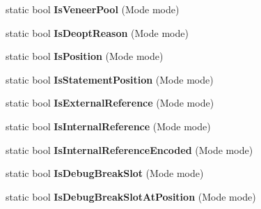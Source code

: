 \begin{DoxyCompactItemize}
\item 
static bool {\bfseries Is\+Veneer\+Pool} (Mode mode)\hypertarget{classv8_1_1internal_1_1_reloc_info_a154f34cc6320cbf6c1e8bdad051b5437}{}\label{classv8_1_1internal_1_1_reloc_info_a154f34cc6320cbf6c1e8bdad051b5437}

\item 
static bool {\bfseries Is\+Deopt\+Reason} (Mode mode)\hypertarget{classv8_1_1internal_1_1_reloc_info_acf1f2f5d69d0605ae6a4427fb0ab4e1c}{}\label{classv8_1_1internal_1_1_reloc_info_acf1f2f5d69d0605ae6a4427fb0ab4e1c}

\item 
static bool {\bfseries Is\+Position} (Mode mode)\hypertarget{classv8_1_1internal_1_1_reloc_info_a3494835fa667ff485f1cdbfe9995c392}{}\label{classv8_1_1internal_1_1_reloc_info_a3494835fa667ff485f1cdbfe9995c392}

\item 
static bool {\bfseries Is\+Statement\+Position} (Mode mode)\hypertarget{classv8_1_1internal_1_1_reloc_info_adb25b20e8e5daeced667dde430727ba4}{}\label{classv8_1_1internal_1_1_reloc_info_adb25b20e8e5daeced667dde430727ba4}

\item 
static bool {\bfseries Is\+External\+Reference} (Mode mode)\hypertarget{classv8_1_1internal_1_1_reloc_info_a5c60c6f1f4f0b00645865a4872b89859}{}\label{classv8_1_1internal_1_1_reloc_info_a5c60c6f1f4f0b00645865a4872b89859}

\item 
static bool {\bfseries Is\+Internal\+Reference} (Mode mode)\hypertarget{classv8_1_1internal_1_1_reloc_info_ae71eaf1d47bbb5222a7163a00aab7709}{}\label{classv8_1_1internal_1_1_reloc_info_ae71eaf1d47bbb5222a7163a00aab7709}

\item 
static bool {\bfseries Is\+Internal\+Reference\+Encoded} (Mode mode)\hypertarget{classv8_1_1internal_1_1_reloc_info_a6e8c55148df1c61000d41175cc8a0072}{}\label{classv8_1_1internal_1_1_reloc_info_a6e8c55148df1c61000d41175cc8a0072}

\item 
static bool {\bfseries Is\+Debug\+Break\+Slot} (Mode mode)\hypertarget{classv8_1_1internal_1_1_reloc_info_a01b23fb31661beba3637943088752467}{}\label{classv8_1_1internal_1_1_reloc_info_a01b23fb31661beba3637943088752467}

\item 
static bool {\bfseries Is\+Debug\+Break\+Slot\+At\+Position} (Mode mode)\hypertarget{classv8_1_1internal_1_1_reloc_info_ac73d1d0659b57b0b3117ef65aa651c49}{}\label{classv8_1_1internal_1_1_reloc_info_ac73d1d0659b57b0b3117ef65aa651c49}


\end{DoxyCompactItemize}
